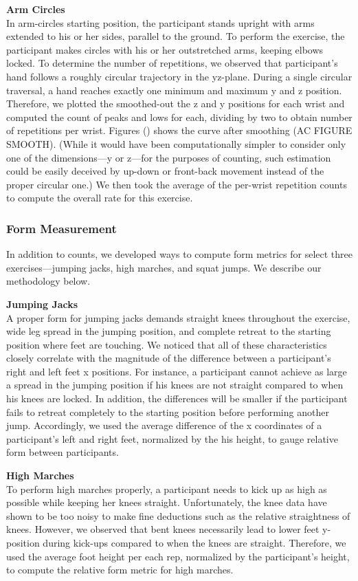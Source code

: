 \textbf{Arm Circles} \\
In arm-circles starting position, the participant stands upright with arms extended to his or her sides, parallel to the ground. To perform the exercise, the participant makes circles with his or her outstretched arms, keeping elbows locked. To determine the number of repetitions, we observed that participant’s hand follows a roughly circular trajectory in the yz-plane. During a single circular traversal, a hand reaches exactly one minimum and maximum y and z position. Therefore, we plotted the smoothed-out the z and y positions for each wrist and computed the count of peaks and lows for each, dividing by two to obtain number of repetitions per wrist. Figures () shows the curve after smoothing (AC FIGURE SMOOTH). (While it would have been computationally simpler to consider only one of the dimensions—y or z—for the purposes of counting, such estimation could be easily deceived by up-down or front-back movement instead of the proper circular one.) We then took the average of the per-wrist repetition counts to compute the overall rate for this exercise.

\subsubsection{Form Measurement}

In addition to counts, we developed ways to compute form metrics for select three exercises—jumping jacks, high marches, and squat jumps. We describe our methodology below.

\textbf{Jumping Jacks} \\
A proper form for jumping jacks demands straight knees throughout the exercise, wide leg spread in the jumping position, and complete retreat to the starting position where feet are touching. We noticed that all of these characteristics closely correlate with the magnitude of the difference between a participant’s right and left feet x positions. For instance, a participant cannot achieve as large a spread in the jumping position if his knees are not straight compared to when his knees are locked. In addition, the differences will be smaller if the participant fails to retreat completely to the starting position before performing another jump. Accordingly, we used the average difference of the x coordinates of a participant’s left and right feet, normalized by the his height, to gauge relative form between participants.

\textbf{High Marches} \\
To perform high marches properly, a participant needs to kick up as high as possible while keeping her knees straight. Unfortunately, the knee data have shown to be too noisy to make fine deductions such as the relative straightness of knees. However, we observed that bent knees necessarily lead to lower feet y-position during kick-ups compared to when the knees are straight. Therefore, we used the average foot height per each rep, normalized by the participant’s height, to compute the relative form metric for high marches.

